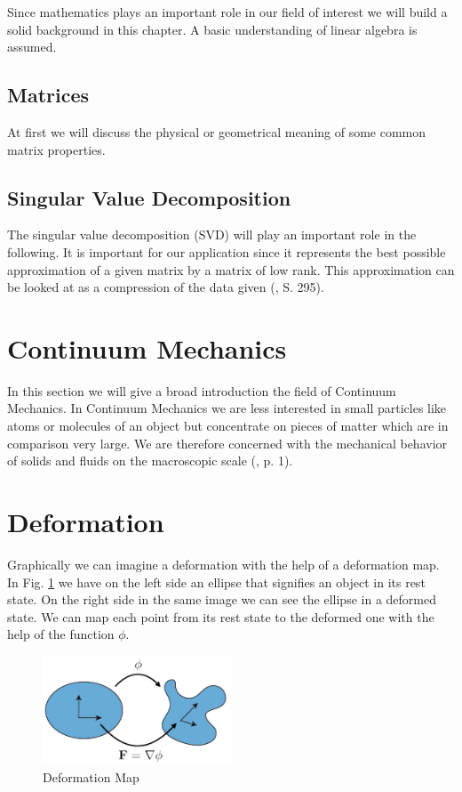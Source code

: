 Since mathematics plays an important role in our field of interest we will build a solid background in this chapter. A basic understanding of linear algebra is assumed.

\subsection{Matrices}
At first we will discuss the physical or geometrical meaning of some common matrix properties.


\subsection{Singular Value Decomposition}

The singular value decomposition (SVD) will play an important role in the following. It is important for our application since it represents the best possible approximation of a given matrix by a matrix of low rank. This approximation can be looked at as a compression of the data given (\cite{LiesenMehrmann2015}, S. 295).

\section{Continuum Mechanics}
In this section we will give a broad introduction the field of Continuum Mechanics.
In Continuum Mechanics we are less interested in small particles like atoms or molecules of an object but concentrate on pieces of matter which are in comparison very large. We are therefore concerned with the mechanical behavior of solids and fluids on the macroscopic scale (\cite{Spencer1980}, p. 1).


\section{Deformation}
Graphically we can imagine a deformation with the help of a deformation map. In Fig. \ref{fig:deformationmap} we have on the left side an ellipse that signifies an object in its rest state. On the right side in the same image we can see the ellipse in a deformed state. We can map each point from its rest state to the deformed one with the help of the function $\phi$.

\begin{figure}[!htbp]
	\centering
	\includegraphics[width=0.5\textwidth]{resources/deformation_map}
	\caption{Deformation Map {\cite{STREAM2018}}}
	\label{fig:deformationmap}
\end{figure}

